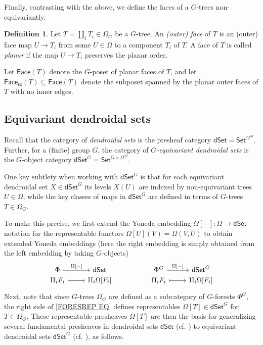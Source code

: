 \documentclass[a4paper,10pt]{article}%
\numberwithin{equation}{section}
\numberwithin{figure}{section}
\theoremstyle{definition} %
\newtheorem{definition}[equation]{Definition}%
\newcommand{\1}{\ensuremath{\mathbbm 1}}%
\begin{document}
Finally, contrasting with the above, we define the faces of a $G$-trees non-equivariantly.

\begin{definition}
	Let $T = \amalg_i T_i \in \Omega_G$ be a $G$-tree.
	An \textit{(outer) face} of $T$ is an (outer) face map $U \to T_i$ from some $U \in \Omega$ to a component $T_i$ of $T$.
	A face of $T$ is called \textit{planar} if the map $U \to T_i$ preserves the planar order.

	Let $\mathsf{Face}(T)$ denote the $G$-poset of planar faces of $T$,
	and let $\mathsf{Face}_{\mathsf{sc}}(T) \subseteq \mathsf{Face}(T)$ denote the subposet spanned by the planar outer faces of $T$ with no inner edges.
\end{definition}





\subsection{Equivariant dendroidal sets}
\label{EDS_SEC}

Recall that the category of \emph{dendroidal sets}
is the presheaf category
$\mathsf{dSet} = \mathsf{Set}^{\Omega^{op}}$.
Further, for a (finite) group $G$,
the category of
\emph{$G$-equivariant dendroidal sets}
is the $G$-object category
$\mathsf{dSet}^G = \mathsf{Set}^{G \times \Omega^{op}}$.


One key subtlety when working with 
$\mathsf{dSet}^G$
is that for each equivariant dendroidal set 
$X \in \mathsf{dSet}^G$
its levels $X(U)$ are indexed by
non-equivariant trees $U \in \Omega$,
while the key classes of maps in $\mathsf{dSet}^G$ are defined in terms
of $G$-trees $T \in \Omega_G$.

To make this precise, 
we first extend the Yoneda embedding
$\Omega[-]\colon \Omega \to \mathsf{dSet}$
notation
for the representable functors
$\Omega[U](V) = \Omega(V,U)$
to obtain extended Yoneda embeddings
(here the right embedding is simply obtained from the left embedding by taking $G$-objects)
\begin{equation}\label{FORESREP EQ}
\begin{tikzcd}[row sep=0]
	\Phi \ar{r}{\Omega[-]}
&
	\mathsf{dSet}
&&%
	\Phi^G \ar{r}{\Omega[-]}
&
	\mathsf{dSet}^G
\\
	\amalg_i F_i
	\ar[mapsto]{r}
&
	\amalg_i \Omega[F_i]
&&%
	\amalg_i F_i
	\ar[mapsto]{r}
&
	\amalg_i \Omega[F_i]
\end{tikzcd}
\end{equation}
Next, note that since $G$-trees $\Omega_G$
are defined as a subcategory of $G$-forests $\Phi^G$,
the right side of 
\eqref{FORESREP EQ}
defines representables 
$\Omega[T] \in \mathsf{dSet}^G$
for $T \in \Omega_G$.
These representable presheaves 
$\Omega[T]$
are then the basis for
generalizing several fundamental
presheaves in dendroidal sets $\mathsf{dSet}$
(cf. \cite[\S 2]{CM13a})
to equivariant dendroidal sets
$\mathsf{dSet}^G$
(cf. \cite[\S 6]{Per18}),
as follows.
\end{document}
